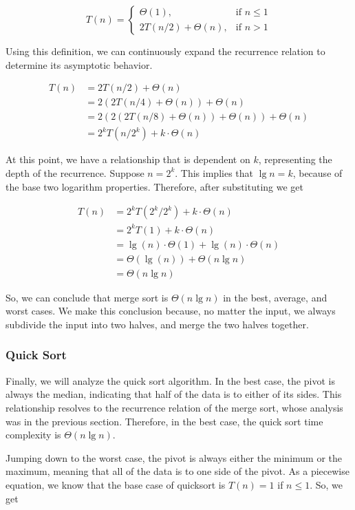 \straightbraces
\[
T(n)=
  \begin{cases}
    \Theta(1), & \text{if } n \leq 1\\
    2T(n/2) + \Theta(n), & \text{if } n > 1
  \end{cases}
\]

Using this definition, we can continuously expand the recurrence relation to determine its asymptotic behavior.

\begin{align*}
  T(n) &= 2T(n/2) + \Theta(n)\\
       &= 2(2T(n/4) + \Theta(n)) + \Theta(n)\\
       &= 2(2(2T(n/8) + \Theta(n)) + \Theta(n)) + \Theta(n)\\
       &= 2^kT(n/2^k) + k\cdot\Theta(n)
\end{align*}

At this point, we have a relationship that is dependent on $k$, representing the depth of the recurrence. Suppose $n=2^k$. This implies that $\lg{n} = k$, because of the base two logarithm properties. Therefore, after substituting we get

\begin{align*}
  T(n) &= 2^kT(2^k/2^k) + k\cdot\Theta(n)\\
       &= 2^kT(1) + k\cdot\Theta(n)\\
       &= \lg(n)\cdot\Theta(1) + \lg(n)\cdot \Theta(n)\\
       &= \Theta{(\lg(n))} + \Theta{(n \lg n)}\\
       &= \Theta{(n \lg n)} 
\end{align*}

So, we can conclude that merge sort is $\Theta(n\lg{n})$ in the best, average, and worst cases. We make this conclusion because, no matter the input, we always subdivide the input into two halves, and merge the two halves together.

\subsubsection*{Quick Sort}
Finally, we will analyze the quick sort algorithm. In the best case, the pivot is always the median, indicating that half of the data is to either of its sides. This relationship resolves to the recurrence relation of the merge sort, whose analysis was in the previous section. Therefore, in the best case, the quick sort time complexity is $\Theta(n \lg n)$. 

Jumping down to the worst case, the pivot is always either the minimum or the maximum, meaning that all of the data is to one side of the pivot. As a piecewise equation, we know that the base case of quicksort is $T(n) = 1$ if $n \leq 1$. So, we get

